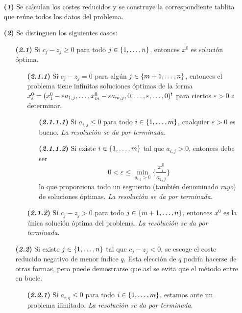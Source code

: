 \documentclass[11pt]{report}
\theoremstyle{mytheorem}
\theoremstyle{mydefinition}
\theoremstyle{myexample}
\begin{document}
\begin{itemize}
    \item[\textbf{(\textit{1})}]Se calculan los costes reducidos y se construye la correspondiente tablita que reúne todos los datos del problema.
    \item[\textbf{(\textit{2})}]Se distinguen los siguientes casos:
    \begin{itemize}
        \item[\textbf{(\textit{2.1})}]Si $c_j-z_j \geq 0$ para todo $j \in \{1,\mathellipsis,n\}$, entonces $x^0$ es solución óptima.
        \begin{itemize}
            \item[\textbf{(\textit{2.1.1})}]Si $c_j-z_j = 0$ para algún $j \in \{m+1,\mathellipsis,n\}$, entonces el problema tiene infinitas soluciones óptimas de la forma $x_\varepsilon^0 = (x^0_1-\varepsilon a_{1,j},\mathellipsis,x^0_m-\varepsilon a_{m,j},0,\mathellipsis,\varepsilon,\mathellipsis,0)^t$ para ciertos $\varepsilon > 0$ a determinar.
            \begin{itemize}
                \item[\textbf{(\textit{2.1.1.1})}]Si $a_{i,j} \leq 0$ para todo $i \in \{1,\mathellipsis,m\}$, cualquier $\varepsilon > 0$ es bueno. {\textit{La resolución se da por terminada}}.
                \item[\textbf{(\textit{2.1.1.2})}]Si existe $i \in \{1,\mathellipsis,m\}$ tal que $a_{i,j} > 0$, entonces debe ser
                \[0 < \varepsilon \leq \min_{a_{i,j} > 0} \biggl\{\frac{x_i^0}{a_{i,j}} \biggr\}\]
                lo que proporciona todo un segmento (también denominado \textit{rayo}) de soluciones óptimas. {\textit{La resolución se da por terminada}}.
            \end{itemize}
            \item[\textbf{(\textit{2.1.2})}]Si $c_j-z_j >0$ para todo $j \in \{m+1,\mathellipsis,n\}$, entonces $x^0$ es la única solución óptima del problema. {\textit{La resolución se da por terminada}}.
            \end{itemize}
        \item[\textbf{(\textit{2.2})}]Si existe $j \in \{1,\mathellipsis,n\}$ tal que $c_j-z_j < 0$, se escoge el coste reducido negativo de menor índice $q$. Esta elección de $q$ podría hacerse de otras formas, pero puede demostrarse que así se evita que el método entre en bucle.
        \begin{itemize}
            \item[\textbf{(\textit{2.2.1})}]Si $a_{i,q} \leq 0$ para todo $i \in \{1,\mathellipsis,m\}$, estamos ante un problema ilimitado. {\textit{La resolución se da por terminada}}.

\end{itemize}
\end{itemize}
\end{itemize}
\end{document}
